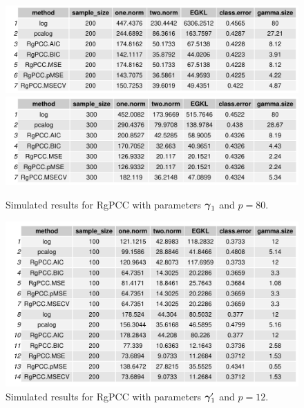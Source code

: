 \documentclass[main.tex]{subfiles}
\begin{document}
\begin{figure}[H]
	\centering
	\includegraphics[width =  \textwidth]{simulated/(sparsity1-100,80)_metrics.pdf}
	\includegraphics[width =  \textwidth]{simulated/(sparsity1-200,80)_metrics.pdf}
	\caption{Simulated results for RgPCC with parameters $\boldsymbol \gamma_1$ and $p = 80$.}
	\label{fig:simulated1-80}
\end{figure}

\begin{figure}[H]
	\centering
	\includegraphics[width =  \textwidth]{simulated/(sparsity1-nonlead,12)_metrics.pdf}
	\caption{Simulated results for RgPCC with parameters $\boldsymbol \gamma_1'$ and $p = 12$.}
	\label{fig:simulated1-12-nonlead}
\end{figure}
\end{document}
